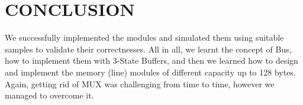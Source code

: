 \documentclass[pdftex,12pt,a4paper]{article}
\begin{document}
\section{CONCLUSION}
We successfully implemented the modules and simulated them using suitable samples to validate their correctnesses.  All in all, we learnt the concept of Bus, how to implement them with 3-State Buffers, and then we learned how to design and implement the memory (line) modules of different capacity up to 128 bytes.  Again, getting rid of MUX was challenging from time to time, however we managed to overcome it.




\nocite{ref1}
\nocite{overleaf}
\end{document}
